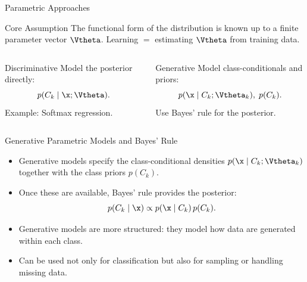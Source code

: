 \begin{frame}{Parametric Approaches}
  \begin{block}{Core Assumption}
    The functional form of the distribution is known up to a finite parameter vector $\Vtheta$.
    Learning $=$ estimating $\Vtheta$ from training data.
  \end{block}
  \vspace{0.5em}
  \begin{columns}[t]
      \begin{block}{Discriminative}
        Model the posterior directly:
        \[
          p(C_k \mid \x;\Vtheta).
        \]
        Example: Softmax regression.
      \end{block}
      \begin{block}{Generative}
        Model class-conditionals and priors:
        \[
          p(\x \mid C_k;\Vtheta_k),\; p(C_k).
        \]
        Use Bayes' rule for the posterior.
      \end{block}
  \end{columns}
\end{frame}

\begin{frame}{Generative Parametric Models and Bayes' Rule}
  \begin{itemize}
    \item Generative models specify the class-conditional densities $p(\x \mid C_k;\Vtheta_k)$ together with the class priors $p(C_k)$.
    \item Once these are available, Bayes' rule provides the posterior:
    \[
      p(C_k \mid \x) \propto p(\x \mid C_k)\,p(C_k).
    \]
    \item Generative models are more structured: they model how data are generated within each class.
    \item Can be used not only for classification but also for \alert{sampling} or handling \alert{missing data}.
  \end{itemize}
\end{frame}

